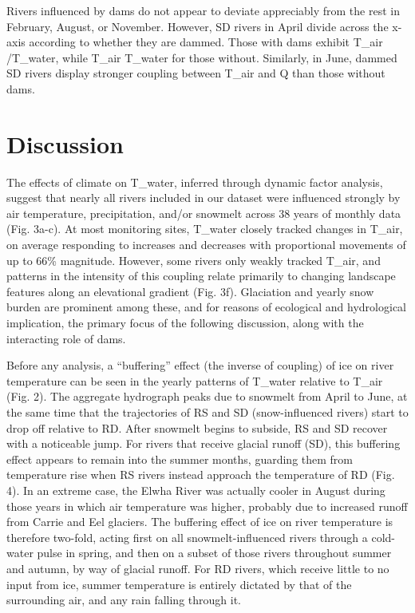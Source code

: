 Rivers influenced by dams do not appear to deviate appreciably from the rest in February, August, or November. However, SD rivers in April divide across the x-axis according to whether they are dammed. Those with dams exhibit T_air /T_water, while T_air \propto T_water for those without. Similarly, in June, dammed SD rivers display stronger coupling between T_air and Q than those without dams.

\section*{Discussion}

The effects of climate on T_water, inferred through dynamic factor analysis, suggest that nearly all rivers included in our dataset were influenced strongly by air temperature, precipitation, and/or snowmelt across 38 years of monthly data (Fig. 3a-c). At most monitoring sites, T_water closely tracked changes in T_air, on average responding to increases and decreases with proportional movements of up to 66\% magnitude. However, some rivers only weakly tracked T_air, and patterns in the intensity of this coupling relate primarily to changing landscape features along an elevational gradient (Fig. 3f). Glaciation and yearly snow burden are prominent among these, and for reasons of ecological and hydrological implication, the primary focus of the following discussion, along with the interacting role of dams.

Before any analysis, a ``buffering'' effect (the inverse of coupling) of ice on river temperature can be seen in the yearly patterns of T_water relative to T_air (Fig. 2). The aggregate hydrograph peaks due to snowmelt from April to June, at the same time that the trajectories of RS and SD (snow-influenced rivers) start to drop off relative to RD. After snowmelt begins to subside, RS and SD recover with a noticeable jump. For rivers that receive glacial runoff (SD), this buffering effect appears to remain into the summer months, guarding them from temperature rise when RS rivers instead approach the temperature of RD (Fig. 4). In an extreme case, the Elwha River was actually cooler in August during those years in which air temperature was higher, probably due to increased runoff from Carrie and Eel glaciers. The buffering effect of ice on river temperature is therefore two-fold, acting first on all snowmelt-influenced rivers through a cold-water pulse in spring, and then on a subset of those rivers throughout summer and autumn, by way of glacial runoff. For RD rivers, which receive little to no input from ice, summer temperature is entirely dictated by that of the surrounding air, and any rain falling through it.

